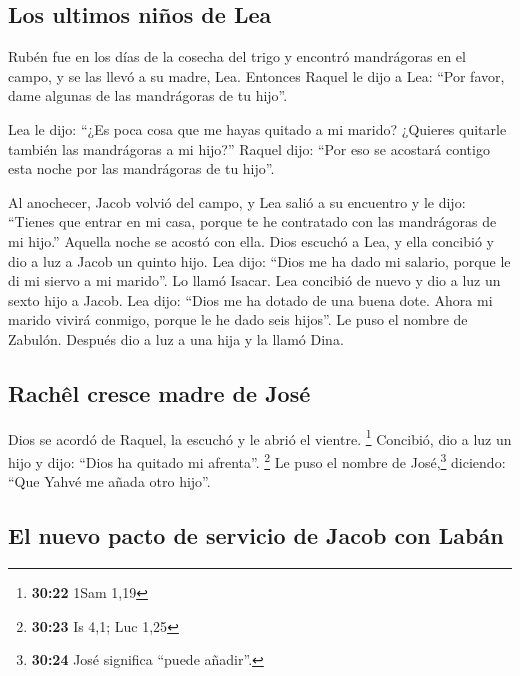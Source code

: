 \begin{paracol}{2}
\hypertarget{los-ultimos-niuxf1os-de-lea}{%
\subsection{Los ultimos niños de
Lea}\label{los-ultimos-niuxf1os-de-lea}}

 Rubén fue en los días de la cosecha del trigo y encontró
mandrágoras en el campo, y se las llevó a su madre, Lea. Entonces Raquel
le dijo a Lea: ``Por favor, dame algunas de las mandrágoras de tu
hijo''.

 Lea le dijo: ``¿Es poca cosa que me hayas quitado a mi
marido? ¿Quieres quitarle también las mandrágoras a mi hijo?'' Raquel
dijo: ``Por eso se acostará contigo esta noche por las mandrágoras de tu
hijo''.

 Al anochecer, Jacob volvió del campo, y Lea salió a su
encuentro y le dijo: ``Tienes que entrar en mi casa, porque te he
contratado con las mandrágoras de mi hijo.'' Aquella noche se acostó con
ella.  Dios escuchó a Lea, y ella concibió y dio a luz a
Jacob un quinto hijo.  Lea dijo: ``Dios me ha dado mi
salario, porque le di mi siervo a mi marido''. Lo llamó Isacar.
 Lea concibió de nuevo y dio a luz un sexto hijo a Jacob.
 Lea dijo: ``Dios me ha dotado de una buena dote. Ahora
mi marido vivirá conmigo, porque le he dado seis hijos''. Le puso el
nombre de Zabulón.  Después dio a luz a una hija y la
llamó Dina.

\hypertarget{rachuxeal-cresce-madre-de-josuxe9}{%
\subsection{Rachêl cresce madre de
José}\label{rachuxeal-cresce-madre-de-josuxe9}}

 Dios se acordó de Raquel, la escuchó y le abrió el
vientre. \footnote{\textbf{30:22} 1Sam 1,19}  Concibió,
dio a luz un hijo y dijo: ``Dios ha quitado mi afrenta''. \footnote{\textbf{30:23}
  Is 4,1; Luc 1,25}  Le puso el nombre de
José,\footnote{\textbf{30:24} José significa ``puede añadir''.}
diciendo: ``Que Yahvé me añada otro hijo''.

\hypertarget{el-nuevo-pacto-de-servicio-de-jacob-con-labuxe1n}{%
\subsection{El nuevo pacto de servicio de Jacob con
Labán}\label{el-nuevo-pacto-de-servicio-de-jacob-con-labuxe1n}}


\end{paracol}
